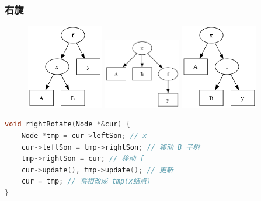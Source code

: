 \documentclass[utf8]{ctexbeamer}
\begin{document}
    \begin{frame}[fragile]
        \frametitle{右旋}
    
        \begin{figure}
            \includegraphics[width=0.3\textwidth]{images/right_rotate0.png}
            \includegraphics[width=0.3\textwidth]{images/right_rotate1.png}
            \includegraphics[width=0.3\textwidth]{images/right_rotate2.png}
        \end{figure}
    
        \begin{lstlisting}[language=c++]
void rightRotate(Node *&cur) {
    Node *tmp = cur->leftSon; // x
    cur->leftSon = tmp->rightSon; // 移动 B 子树
    tmp->rightSon = cur; // 移动 f
    cur->update(), tmp->update(); // 更新
    cur = tmp; // 将根改成 tmp(x结点)
}
        \end{lstlisting}
    \end{frame}
\end{document}
